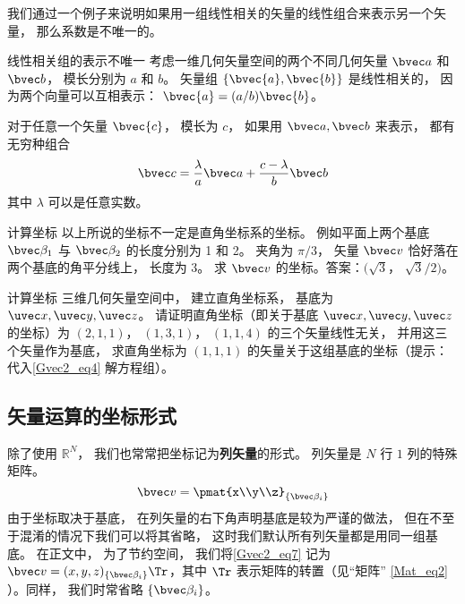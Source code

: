 我们通过一个例子来说明如果用一组线性相关的矢量的线性组合来表示另一个矢量， 那么系数是不唯一的。

\begin{example}{线性相关组的表示不唯一}
考虑一维几何矢量空间的两个不同几何矢量 $\bvec a$ 和 $\bvec b$， 模长分别为 $a$ 和 $b$。 矢量组 $\{\bvec{a}, \bvec{b}\}$ 是线性相关的， 因为两个向量可以互相表示： $\bvec{a}=(a/b)\bvec{b}$。

对于任意一个矢量 $\bvec{c}$， 模长为 $c$， 如果用 $\bvec a, \bvec b$ 来表示， 都有无穷种组合
\begin{equation}
\bvec c = \frac{\lambda}{a} \bvec a + \frac{c - \lambda}{b} \bvec b
\end{equation}
其中 $\lambda$ 可以是任意实数。
\end{example}

\begin{exercise}{计算坐标}
以上所说的坐标不一定是直角坐标系的坐标。 例如平面上两个基底 $\bvec \beta_1$ 与 $\bvec \beta_2$ 的长度分别为 1 和 2。 夹角为 $\pi/3$， 矢量 $\bvec v$ 恰好落在两个基底的角平分线上， 长度为 3。 求 $\bvec v$ 的坐标。答案：$(\sqrt 3$， $\sqrt 3/2)$。
\end{exercise}

\begin{exercise}{计算坐标}
三维几何矢量空间中， 建立直角坐标系， 基底为 $\uvec x, \uvec y, \uvec z$。 请证明直角坐标（即关于基底 $\uvec x, \uvec y, \uvec z$ 的坐标）为 $(2, 1, 1)$， $(1, 3, 1)$， $(1, 1, 4)$ 的三个矢量线性无关， 并用这三个矢量作为基底， 求直角坐标为 $(1, 1, 1)$ 的矢量关于这组基底的坐标（提示：代入\autoref{Gvec2_eq4} 解方程组）。
\end{exercise}

\subsection{矢量运算的坐标形式}
除了使用 $\mathbb R^N$， 我们也常常把坐标记为\textbf{列矢量}的形式。 列矢量是 $N$ 行 $1$ 列的特殊矩阵。
\begin{equation}\label{Gvec2_eq7}
\bvec v = \pmat{x\\y\\z}_{\{\bvec\beta_i\}}
\end{equation}
由于坐标取决于基底， 在列矢量的右下角声明基底是较为严谨的做法， 但在不至于混淆的情况下我们可以将其省略， 这时我们默认所有列矢量都是用同一组基底。 在正文中， 为了节约空间， 我们将\autoref{Gvec2_eq7} 记为 $\bvec v = (x, y, z)_{\{\bvec\beta_i\}}\Tr$，其中 $\Tr$ 表示矩阵的转置（见“矩阵” \autoref{Mat_eq2} ）。同样， 我们时常省略 $\{\bvec\beta_i\}$。

